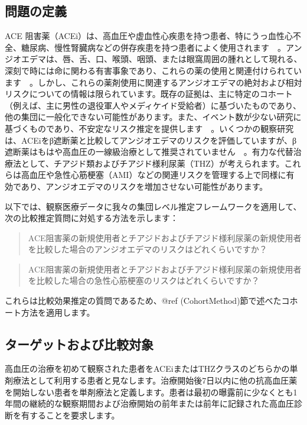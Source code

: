 \documentclass[
  11pt]{book}
\theoremstyle{definition}
\theoremstyle{definition}
\theoremstyle{definition}
\theoremstyle{definition}
\theoremstyle{remark}
\begin{document}
\subsection{問題の定義}\label{ux554fux984cux306eux5b9aux7fa9-1}

ACE 阻害薬（ACEi）は、高血圧や虚血性心疾患を持つ患者、特にうっ血性心不全、糖尿病、慢性腎臓病などの併存疾患を持つ患者によく使用されます　\citep{zaman_2002}。アンジオエデマは、唇、舌、口、喉頭、咽頭、または眼窩周囲の腫れとして現れる、深刻で時には命に関わる有害事象であり、これらの薬の使用と関連付けられています　\citep{sabroe_1997}。しかし、これらの薬剤使用に関連するアンジオエデマの絶対および相対リスクについての情報は限られています。既存の証拠は、主に特定のコホート（例えば、主に男性の退役軍人やメディケイド受給者）に基づいたものであり、他の集団に一般化できない可能性があります。また、イベント数が少ない研究に基づくものであり、不安定なリスク推定を提供します　\citep{powers_2012}。いくつかの観察研究は、ACEiをβ遮断薬と比較してアンジオエデマのリスクを評価しています\citep{magid_2010, toh_2012}が、β遮断薬はもはや高血圧の一線級治療として推奨されていません　\citep{whelton_2018}。有力な代替治療法として、チアジド類およびチアジド様利尿薬（THZ）が考えられます。これらは高血圧や急性心筋梗塞（AMI）などの関連リスクを管理する上で同様に有効であり、アンジオエデマのリスクを増加させない可能性があります。

以下では、観察医療データに我々の集団レベル推定フレームワークを適用して、次の比較推定質問に対処する方法を示します：

\begin{quote}
ACE阻害薬の新規使用者とチアジドおよびチアジド様利尿薬の新規使用者を比較した場合のアンジオエデマのリスクはどれくらいですか？
\end{quote}

\begin{quote}
ACE阻害薬の新規使用者とチアジドおよびチアジド様利尿薬の新規使用者を比較した場合の急性心筋梗塞のリスクはどれくらいですか？
\end{quote}

これらは比較効果推定の質問であるため、@ref (CohortMethod)節で述べたコホート方法を適用します。

\subsection{ターゲットおよび比較対象}\label{ux30bfux30fcux30b2ux30c3ux30c8ux304aux3088ux3073ux6bd4ux8f03ux5bfeux8c61}

高血圧の治療を初めて観察された患者をACEiまたはTHZクラスのどちらかの単剤療法として利用する患者と見なします。治療開始後7日以内に他の抗高血圧薬を開始しない患者を単剤療法と定義します。患者は最初の曝露前に少なくとも1年間の継続的な観察期間および治療開始の前年または前年に記録された高血圧診断を有することを要求します。
\end{document}
